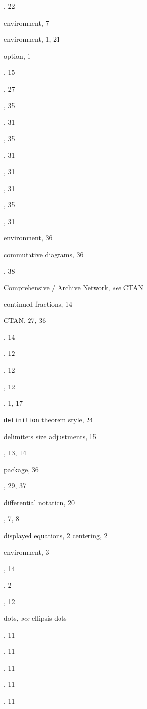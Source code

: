 \documentclass[leqno,titlepage,openany]{amsldoc}
\providecommand{\see}[2]{\textit{see} #1}
\begin{document}
\begin{theindex}
  \item {}, 22
  \item {} environment, 7
  \item {} environment, 1, 21
  \item {} option, 1
  \item {}, 15
  \item {}, 27
  \item {}, 35
  \item {}, 31
  \item {}, 35
  \item {}, 31
  \item {}, 31
  \item {}, 31
  \item {}, 35
  \item {}, 31
  \item {} environment, 36
  \item commutative diagrams, 36
  \item {}, 38
  \item Comprehensive \tex/ Archive Network, \see{CTAN}{27}
  \item continued fractions, 14
  \item CTAN, 27, 36

  \indexspace

  \item {}, 14
  \item {}, 12
  \item {}, 12
  \item {}, 12
  \item {}, 1, 17
  \item \texttt{definition} theorem style, 24
  \item delimiters
    \subitem size adjustments, 15
  \item {}, 13, 14
  \item {} package, 36
  \item {}, 29, 37
  \item differential notation, 20
  \item {}, 7, 8
  \item displayed equations, 2
    \subitem centering, 2
  \item {} environment, 3
  \item {}, 14
  \item {}, 2
  \item {}, 12
  \item dots, \see{ellipsis dots}{10}
  \item {}, 11
  \item {}, 11
  \item {}, 11
  \item {}, 11
  \item {}, 11


\end{theindex}
\end{document}

